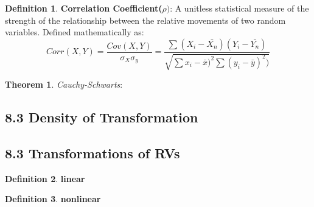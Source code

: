 \documentclass[12pt]{amsart}
\theoremstyle{definition}
\newtheorem{theorem}{Theorem}  %
\newtheorem{definition}{Definition} %
\numberwithin{equation}{theorem}    %
\begin{document}
\begin{definition}
    \textbf{Correlation Coefficient($\rho)$}:
    A unitless statistical measure of the strength of the relationship between the relative movements of two random variables. Defined mathematically as:
    $$Corr(X,Y) = \frac{Cov(X,Y)}{\sigma_X\sigma_y} =
    \frac{\sum (X_i - \bar{X_n})(Y_i-\bar{Y_n})}{\sqrt{\sum x_i - \bar{x})^2\sum (y_i - \bar{y})^2)}}$$
\end{definition}



\begin{theorem}
    \textit{Cauchy-Schwarts}:

\end{theorem}

\subsection*{8.3 Density of Transformation}


\subsection*{8.3 Transformations of RVs}

\begin{definition}
    \textbf{linear}
\end{definition}



\begin{definition}
    \textbf{nonlinear}
\end{definition}
\end{document}

